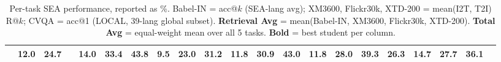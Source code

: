 \documentclass[11pt]{article}
\begin{document}
\begin{table}[h!]
{\begin{tabular}{l c ccc ccc ccc ccc ccc c ccc}
  & 12.0 & 24.7 & \text{---} & \textbf{14.0} & \textbf{33.4} & \textbf{43.8} & 9.5 & \textbf{23.0} & \textbf{31.2} & 11.8 & \textbf{30.9} & \textbf{43.0} & 11.8 & \textbf{28.0} & \textbf{39.3} & 26.3 & 14.7 & \textbf{27.7} & \textbf{36.1} \\
\bottomrule\end{tabular}
}
\caption{Per-task SEA performance, reported as \%.
  Babel-IN = acc@$k$ (SEA-lang avg); XM3600, Flickr30k, XTD-200 = mean(I2T, T2I) R@$k$;
  CVQA = acc@1 (LOCAL, 39-lang global subset).
  \textbf{Retrieval Avg} = mean(Babel-IN, XM3600, Flickr30k, XTD-200).
  \textbf{Total Avg} = equal-weight mean over all 5 tasks.
  \textbf{Bold} = best student per column.}
\label{tab:per_task_rk_mean}
\end{table}
\end{document}
